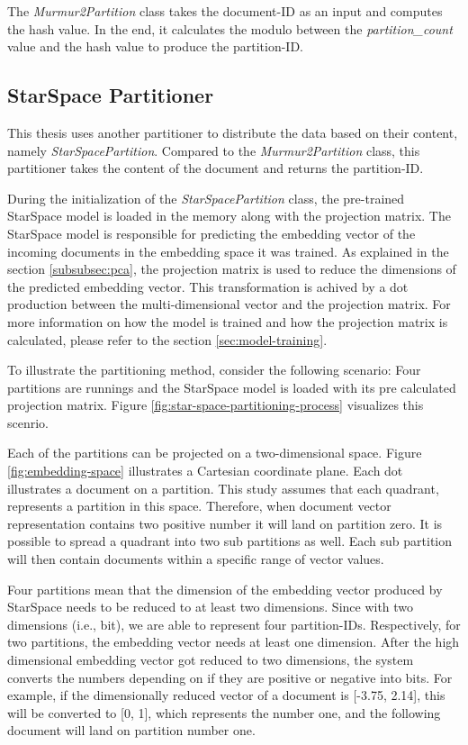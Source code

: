 The \emph{Murmur2Partition} class takes the document-ID as an input and computes the hash value. In the end, it calculates the modulo between the \emph{partition\_count} value and the hash value to produce the partition-ID. 

\subsection{StarSpace Partitioner}
\label{subsec:partitioning-star-space}
This thesis uses another partitioner to distribute the data based on their content, namely \emph{StarSpacePartition}. Compared to the \emph{Murmur2Partition} class, this partitioner takes the content of the document and returns the partition-ID.


During the initialization of the \emph{StarSpacePartition} class, the pre-trained StarSpace model is loaded in the memory along with the projection matrix. The StarSpace model is responsible for predicting the embedding vector of the incoming documents in the embedding space it was trained. As explained in the section \ref{subsubsec:pca}, the projection matrix is used to reduce the dimensions of the predicted embedding vector. This transformation is achived by a dot production between the multi-dimensional vector and the projection matrix. For more information on how the model is trained and how the projection matrix is calculated, please refer to the section \ref{sec:model-training}.


To illustrate the partitioning method, consider the following scenario: Four partitions are runnings and the StarSpace model is loaded with its pre calculated projection matrix. Figure \ref{fig:star-space-partitioning-process} visualizes this scenrio. 

Each of the partitions can be projected on a two-dimensional space. Figure \ref{fig:embedding-space} illustrates a Cartesian coordinate plane. Each dot illustrates a document on a partition. This study assumes that each quadrant, represents a partition in this space. Therefore, when document vector representation contains two positive number it will land on partition zero. It is possible to spread a quadrant into two sub partitions as well. Each sub partition will then contain documents within a specific range of vector values.


Four partitions mean that the dimension of the embedding vector produced by StarSpace needs to be reduced to at least two dimensions. Since with two dimensions (i.e., bit), we are able to represent four partition-IDs. Respectively, for two partitions, the embedding vector needs at least one dimension. After the high dimensional embedding vector got reduced to two dimensions, the system converts the numbers depending on if they are positive or negative into bits. For example, if the dimensionally reduced vector of a document is [-3.75, 2.14], this will be converted to [0, 1], which represents the number one, and the following document will land on partition number one.


